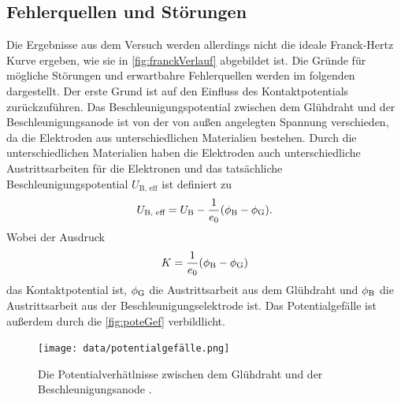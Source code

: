 \subsection{Fehlerquellen und Störungen}
\label{subsec:fehlerStoerung}

Die Ergebnisse aus dem Versuch werden allerdings nicht die ideale Franck-Hertz Kurve ergeben, wie sie in \autoref{fig:franckVerlauf} abgebildet ist. Die Gründe für mögliche Störungen und erwartbahre Fehlerquellen werden im folgenden dargestellt. \newline
Der erste Grund ist auf den Einfluss des Kontaktpotentials zurückzuführen. Das Beschleunigungspotential zwischen dem Glühdraht und der Beschleunigungsanode ist von der von außen angelegten Spannung verschieden, da die Elektroden aus unterschiedlichen Materialien bestehen.
Durch die unterschiedlichen Materialien haben die Elektroden auch unterschiedliche Austrittsarbeiten für die Elektronen und das tatsächliche Beschleunigungspotential $U_{\text {B, eff}}$ ist definiert zu
\begin{align}
    U_{\text {B, eff}} = U_{\text B} - \frac{1}{e_0} (\phi_{\text B} - \phi_{\text G}).
    \label{eqn:potentialGef}
\end{align}
Wobei der Ausdruck
\begin{align}
    K = \frac{1}{e_0} (\phi_{\text B} - \phi_{\text G})
\end{align}
das Kontaktpotential ist, $\phi_{\text G}$ die Austrittsarbeit aus dem Glühdraht und $\phi_{\text B}$ die Austrittsarbeit aus der Beschleunigungselektrode ist.
Das Potentialgefälle ist außerdem durch die \autoref{fig:poteGef} verbildlicht.

\begin{figure}[H]
    \centering
    \texttt{[image: data/potentialgefälle.png]}
    \caption{Die Potentialverhätlnisse zwischen dem Glühdraht und der Beschleunigungsanode \cite{Anleitung601}.}
    \label{fig:poteGef}
\end{figure}

